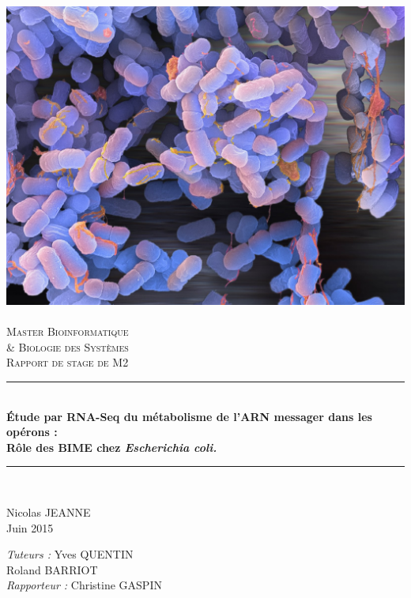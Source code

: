 \documentclass[12pt,a4paper]{report}
\newcommand{\HRule}{\rule{\linewidth}{0.5mm}}
\begin{document}
\thispagestyle{empty}
\setcounter{page}{0}

\begin{titlepage}
  \begin{sffamily}
  \begin{center}

    \includegraphics[scale=0.2]{figures/garde/coli1.jpeg}~\\[1.5cm]

    \textsc{\LARGE Master Bioinformatique \\ \& Biologie des Systèmes}\\[2cm]

    \textsc{\Large Rapport de stage de M2}\\[1.5cm]

    \HRule \\[0.4cm]
    { \huge \bfseries Étude par RNA-Seq du métabolisme de l'ARN messager dans les opérons :\\Rôle des BIME chez \textit{Escherichia coli.}\\[0.4cm] }
    \HRule \\[0.4cm]
\vspace{1.5cm}
    \begin{minipage}{0.4\textwidth}
      \begin{flushleft} \large
        Nicolas JEANNE\\
        Juin 2015\\
      \end{flushleft}
    \end{minipage}
    \begin{minipage}{0.4\textwidth}
      \begin{flushright} \large
        \emph{Tuteurs :} Yves QUENTIN\\
        Roland BARRIOT\\
        \emph{Rapporteur : } Christine GASPIN
      \end{flushright}
    \end{minipage}


\end{center}
\end{sffamily}
\end{titlepage}
\end{document}
